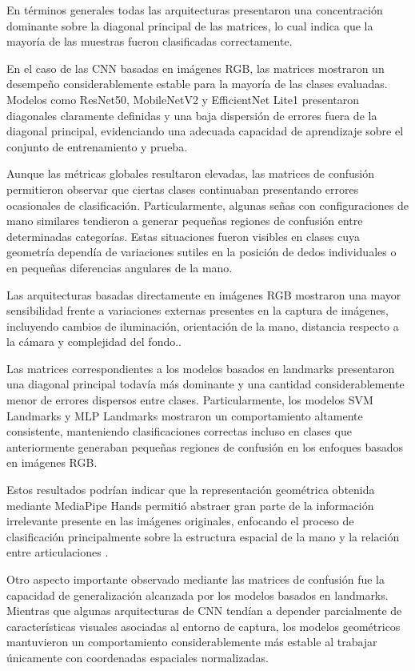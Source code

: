 	En términos generales todas las arquitecturas presentaron una concentración dominante sobre la diagonal principal de las matrices, lo cual indica que la mayoría de las muestras fueron clasificadas correctamente.
	
	En el caso de las CNN basadas en imágenes RGB, las matrices mostraron un desempeño considerablemente estable para la mayoría de las clases evaluadas. Modelos como ResNet50, MobileNetV2 y EfficientNet Lite1 presentaron diagonales claramente definidas y una baja dispersión de errores fuera de la diagonal principal, evidenciando una adecuada capacidad de aprendizaje sobre el conjunto de entrenamiento y prueba.
	
	Aunque las métricas globales resultaron elevadas, las matrices de confusión permitieron observar que ciertas clases continuaban presentando errores ocasionales de clasificación. Particularmente, algunas señas con configuraciones de mano similares tendieron a generar pequeñas regiones de confusión entre determinadas categorías. Estas situaciones fueron visibles en clases cuya geometría dependía de variaciones sutiles en la posición de dedos individuales o en pequeñas diferencias angulares de la mano.
	
	Las arquitecturas basadas directamente en imágenes RGB mostraron una mayor sensibilidad frente a variaciones externas presentes en la captura de imágenes, incluyendo cambios de iluminación, orientación de la mano, distancia respecto a la cámara y complejidad del fondo..
	
	Las matrices correspondientes a los modelos basados en landmarks presentaron una diagonal principal todavía más dominante y una cantidad considerablemente menor de errores dispersos entre clases. Particularmente, los modelos SVM Landmarks y MLP Landmarks mostraron un comportamiento altamente consistente, manteniendo clasificaciones correctas incluso en clases que anteriormente generaban pequeñas regiones de confusión en los enfoques basados en imágenes RGB.
	
	Estos resultados podrían indicar  que la representación geométrica obtenida mediante MediaPipe Hands permitió abstraer gran parte de la información irrelevante presente en las imágenes originales, enfocando el proceso de clasificación principalmente sobre la estructura espacial de la mano y la relación entre articulaciones \cite{mediapipe}.
	
	Otro aspecto importante observado mediante las matrices de confusión fue la capacidad de generalización alcanzada por los modelos basados en landmarks. Mientras que algunas arquitecturas de CNN tendían a depender parcialmente de características visuales asociadas al entorno de captura, los modelos geométricos mantuvieron un comportamiento considerablemente más estable al trabajar únicamente con coordenadas espaciales normalizadas.
	
